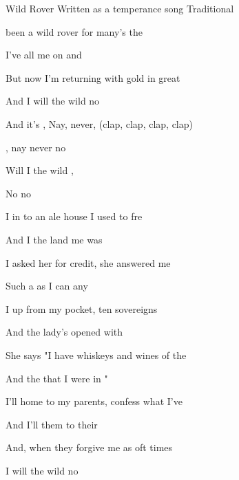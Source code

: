 \begin{SBSong}{Wild Rover}
  {Written as a temperance song}
  {Traditional}
  \begin{SBVerse}
     been a wild rover for many's the  

    I've  all me  on  and 
    
    But now I'm returning with gold in great 
    
    And I  will  the wild  no 
  \end{SBVerse}
  \begin{SBChorus}
    And it's , Nay, never, (clap, clap, clap, clap)
    
    , nay never no 
    
    Will I  the wild ,
    
    No  no 
  \end{SBChorus}
  \begin{SBVerse}
    I  in to an ale house I used to fre
    
    And I  the land me  was 
    
    I asked her for credit, she answered me 
    
    Such a  as  I can  any 
  \end{SBVerse}
  \begin{SBVerse}
    I  up from my pocket, ten sovereigns 
    
    And the lady's  opened  with 
    
    She says "I have whiskeys and wines of the 
    
    And the  that I  were  in "
  \end{SBVerse}
  \begin{SBVerse}
    I'll  home to my parents, confess what I've 
    
    And I'll  them to  their  
    
    And, when they forgive me as oft times 
    
    I  will  the wild  no 
  \end{SBVerse}
\end{SBSong}


